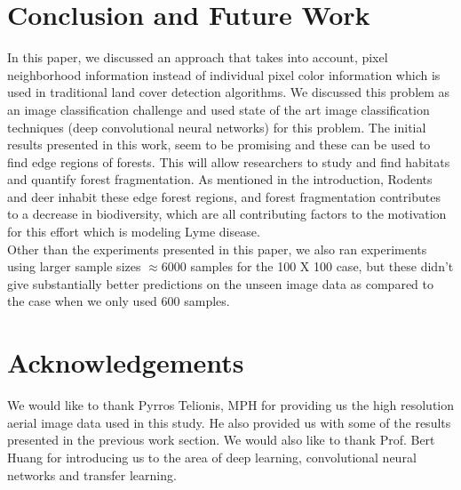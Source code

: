 \documentclass{sigkddExp}
\begin{document}
\section{Conclusion and Future Work}
In this paper, we discussed an approach that takes into account, pixel neighborhood information instead of individual pixel color information which is used in traditional land cover detection algorithms. We discussed this problem as an image classification challenge and used state of the art image classification techniques (deep convolutional neural networks) for this problem. The initial results presented in this work, seem to be promising and these can be used to find edge regions of forests.
This will allow researchers to study and find habitats and quantify forest fragmentation. As mentioned in the introduction,
Rodents and deer inhabit these edge forest regions,
and forest fragmentation contributes to a decrease in biodiversity, which are all contributing factors to the motivation for this effort which is modeling Lyme disease.\\

Other than the experiments presented in this paper, we also ran experiments using larger sample sizes $\approx 6000$ samples for the 100 X 100 case, but these didn't give substantially better predictions on the unseen image data as compared to the case when we only used 600 samples.

\section{Acknowledgements}
We would like to thank Pyrros Telionis, MPH for providing us the high resolution aerial image data used in this study. He also provided us with some of the results presented in the previous work section. We would also like to thank Prof. Bert Huang for introducing us to the area of deep learning, convolutional neural networks and transfer learning.

\newpage


%
%
\end{document}
